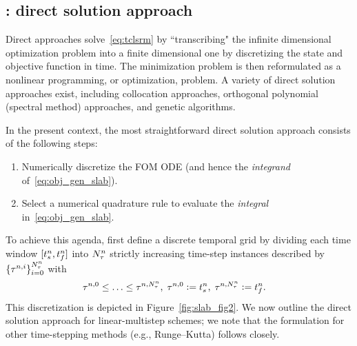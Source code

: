 \subsection{\spatialAcronym: direct solution approach}\label{sec:direct} 
Direct approaches solve~\eqref{eq:tclsrm} by
``transcribing" the infinite dimensional optimization problem into a finite
dimensional one by discretizing the state and objective function in time.
The minimization problem is then reformulated as a nonlinear programming, or
optimization, problem. A variety of direct solution approaches exist, 
including collocation approaches, orthogonal polynomial (spectral  method) 
approaches, and genetic algorithms.  

In the present context, the most straightforward direct solution approach consists of the 
following steps:
\begin{enumerate}
\item Numerically discretize the FOM ODE (and hence the \textit{integrand} of~\eqref{eq:obj_gen_slab}).
\item Select a numerical quadrature rule to evaluate the \textit{integral}
in~\eqref{eq:obj_gen_slab}.
\end{enumerate}
To achieve this agenda, first define a discrete temporal grid 
by dividing each time window $[t_s^{n},t_f^{n}]$ into
$N_{\tau}^{n}$ strictly increasing time-step instances described by
$\{\tau^{n,i}\}_{i=0}^{N_{\tau}^{n}}$ with  
\begin{align}
&\tau^{n,0} \le \ldots \le \tau^{n,N_{\tau}^{n}} , \label{eq:timegrid1} \;
\tau^{n,0} \vcentcolon= t_s^{n},\;
\tau^{n,N_{\tau}^{n}} \vcentcolon= t_f^{n} . 
\end{align}
This discretization is depicted in Figure~\ref{fig:slab_fig2}.
We now outline the direct solution approach for linear-multistep schemes; we note that the formulation for
other time-stepping methods (e.g., Runge--Kutta) follows closely. 
